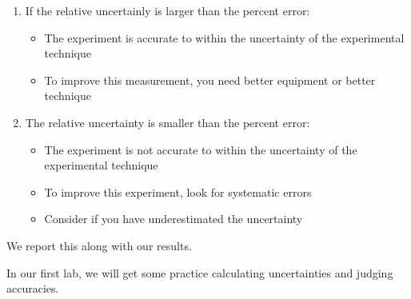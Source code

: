 \documentclass[twoside,11pt,ShortChapTitles]{BYUTextbook}
\begin{document}
\begin{enumerate}
\item If the relative uncertainly is larger than the percent error:

\begin{itemize}
\item The experiment is accurate to within the uncertainty of the experimental technique

\item To improve this measurement, you need better equipment or better technique
\end{itemize}

\item The relative uncertainty is smaller than the percent error:

\begin{itemize}
\item The experiment is not accurate to within the uncertainty of the
experimental technique

\item To improve this experiment, look for systematic errors

\item Consider if you have underestimated the uncertainty
\end{itemize}
\end{enumerate}

We report this along with our results.

In our first lab, we will get some practice calculating uncertainties and
judging accuracies.
\end{document}
